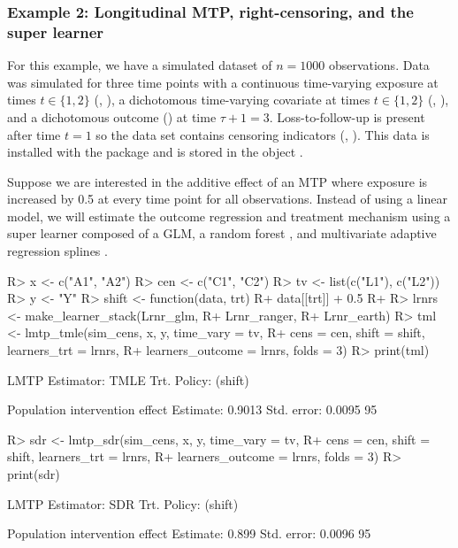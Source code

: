\documentclass[]{jss}
\begin{document}
\hypertarget{example-2-longitudinal-mtp-right-censoring-and-the-super-learner}{%
\subsubsection{Example 2: Longitudinal MTP, right-censoring, and the
super
learner}\label{example-2-longitudinal-mtp-right-censoring-and-the-super-learner}}

For this
example, we have a simulated dataset of \(n = 1000\) observations. Data
was simulated for three time points with a continuous time-varying
exposure at times \(t \in \{1, 2\}\) (, ), a
dichotomous time-varying covariate at times \(t \in \{1, 2\}\)
(, ), and a dichotomous outcome () at time
\(\tau + 1 = 3\). Loss-to-follow-up is present after time \(t = 1\) so the data set
contains censoring indicators (, ). This data is
installed with the package and is stored in the object .

Suppose we are interested in the additive effect of an MTP where exposure
is increased by 0.5 at every time point for all observations. Instead of using a linear model, 
we will estimate the outcome regression and treatment mechanism using a super learner 
composed of a GLM, a random forest \citep{wrightRanger}, 
and multivariate adaptive regression splines \citep{milborrowEarth}. 

\begin{CodeChunk}

\begin{CodeInput}
R> x <- c("A1", "A2")
R> cen <- c("C1", "C2")
R> tv <- list(c("L1"), c("L2"))
R> y <- "Y"
R> shift <- function(data, trt) {
R+   data[[trt]] + 0.5
R+ }
R> lrnrs <- make_learner_stack(Lrnr_glm,
R+                             Lrnr_ranger, 
R+                             Lrnr_earth)
R> tml <- lmtp_tmle(sim_cens, x, y, time_vary = tv, 
R+                  cens = cen, shift = shift, learners_trt = lrnrs, 
R+                  learners_outcome = lrnrs, folds = 3)
R> print(tml)
\end{CodeInput}

\begin{CodeOutput}
LMTP Estimator: TMLE
   Trt. Policy: (shift)

Population intervention effect
      Estimate: 0.9013
    Std. error: 0.0095
        95%
\end{CodeOutput}

\begin{CodeInput}
R> sdr <- lmtp_sdr(sim_cens, x, y, time_vary = tv, 
R+                 cens = cen, shift = shift, learners_trt = lrnrs, 
R+                 learners_outcome = lrnrs, folds = 3)
R> print(sdr)
\end{CodeInput}

\begin{CodeOutput}
LMTP Estimator: SDR
   Trt. Policy: (shift)

Population intervention effect
      Estimate: 0.899
    Std. error: 0.0096
        95%
\end{CodeOutput}

\end{CodeChunk}
\end{document}
